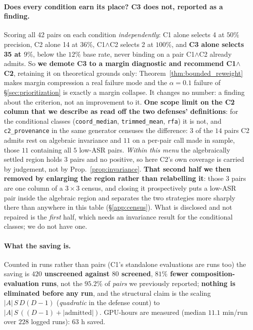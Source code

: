 \documentclass{article}
\begin{document}
\paragraph{Does every condition earn its place? C3 does not, reported as a finding.} Scoring all 42 pairs on each condition \emph{independently}: C1 alone selects 4 at $50\%$ precision, C2 alone 14 at $36\%$, C1$\wedge$C2 selects 2 at $100\%$, and \textbf{C3 alone selects 35 at $9\%$}, below the $12\%$ base rate, never binding on a pair C1$\wedge$C2 already admits. So \textbf{we demote C3 to a margin diagnostic and recommend C1$\wedge$C2}, retaining it on theoretical grounds only: Theorem~\ref{thm:bounded_reweight} makes margin compression a real failure mode and the $\alpha{=}0.1$ failure of \S\ref{sec:prioritization} is exactly a margin collapse. It changes no number: a finding about the criterion, not an improvement to it. \textbf{One scope limit on the C2 column that we describe as read off the two defenses' definitions}: for the conditional classes (\texttt{coord\_median}, \texttt{trimmed\_mean}, \texttt{rfa}) it is not, and \texttt{c2\_provenance} in the same generator censuses the difference: $3$ of the $14$ pairs C2 admits rest on algebraic invariance and $11$ on a per-pair call made in sample, those $11$ containing all $5$ low-ASR pairs. \emph{Within this menu} the algebraically settled region holds $3$ pairs and no positive, so here C2's own coverage is carried by judgement, not by Prop.~\ref{prop:invariance}. \textbf{That second half we then removed by enlarging the region rather than relabelling it}: those $3$ pairs are one column of a $3\times3$ census, and closing it prospectively puts a low-ASR pair inside the algebraic region and separates the two strategies more sharply there than anywhere in this table (\S\ref{app:census}). What is disclosed and not repaired is the \emph{first} half, which needs an invariance result for the conditional classes; we do not have one.

\paragraph{What the saving is.} Counted in runs rather than pairs (C1's standalone evaluations are runs too) the saving is \textbf{$420$ unscreened against $80$ screened}, \textbf{$81\%$ fewer composition-evaluation runs}, not the $95.2\%$ of \emph{pairs} we previously reported; \textbf{nothing is eliminated before any run}, and the structural claim is the scaling $|A|\,S\,D(D{-}1)$ (\emph{quadratic} in the defense count) to $|A|\,S\,((D{-}1)+|\text{admitted}|)$. GPU-hours are measured (median $11.1$ min/run over $228$ logged runs): $63$ h saved.
\end{document}
